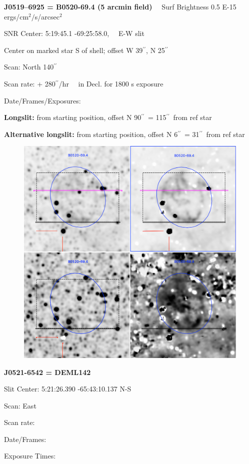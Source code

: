 \documentclass[11pt]{article}
\newcommand{\arcsec}{$^{\prime\prime}$}
\begin{document}
\newpage
{\bf J0519--6925 = B0520-69.4 (5 arcmin field)}  \ \ Surf Brightness 0.5 E-15 ergs/cm$^2/$s/arcsec$^2$
 
SNR Center:   5:19:45.1  -69:25:58.0, \ \  E-W slit 

Center on marked star S of shell; offset W 39\arcsec, N 25\arcsec

Scan:  North 140\arcsec

Scan rate:  + 280\arcsec/hr \ \ in Decl.  for 1800 s exposure

Date/Frames/Exposures:

\vspace{0.20in}
{\bf Longslit:}  from starting position, offset N 90\arcsec\ = 115\arcsec\ from ref star

{\bf Alternative longslit:}  from starting position, offset N 6\arcsec\ = 31\arcsec\ from ref star

\begin{figure}
\includegraphics[width=12.5cm]{snapshots/B0520_694_5arcmin.png}
\end{figure}

\newpage
{\bf J0521-6542 = DEML142}  
 
Slit Center:   5:21:26.390   -65:43:10.137   N-S

Scan:  East

Scan rate:  

Date/Frames:

Exposure Times:  
\end{document}
